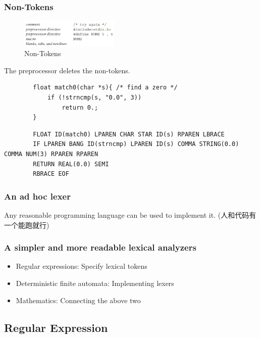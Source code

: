 \subsubsection{Non-Tokens}
\begin{figure}[!htb]
    \centering
    \includegraphics[width=0.42\textwidth]{pic/CP2/Non-Tokens}
    \caption{Non-Tokens}
\end{figure}
The preprocessor deletes the non-tokens.

\begin{example}\quad

    \begin{verbatim}
        float match0(char *s){ /* find a zero */
            if (!strncmp(s, "0.0", 3))
                return 0.;
        }
    \end{verbatim}
    
    \begin{verbatim}
        FLOAT ID(match0) LPAREN CHAR STAR ID(s) RPAREN LBRACE 
        IF LPAREN BANG ID(strncmp) LPAREN ID(s) COMMA STRING(0.0) COMMA NUM(3) RPAREN RPAREN 
        RETURN REAL(0.0) SEMI 
        RBRACE EOF
    \end{verbatim}
\end{example}




\subsubsection{An ad hoc lexer}
Any reasonable programming language can be used to implement it. (人和代码有一个能跑就行)

\subsubsection{A simpler and more readable lexical analyzers}
\begin{itemize}
    \item Regular expressions: Specify lexical tokens
    \item Deterministic finite automata: Implementing lexers
    \item Mathematics: Connecting the above two
\end{itemize}

\subsection{Regular Expression}
